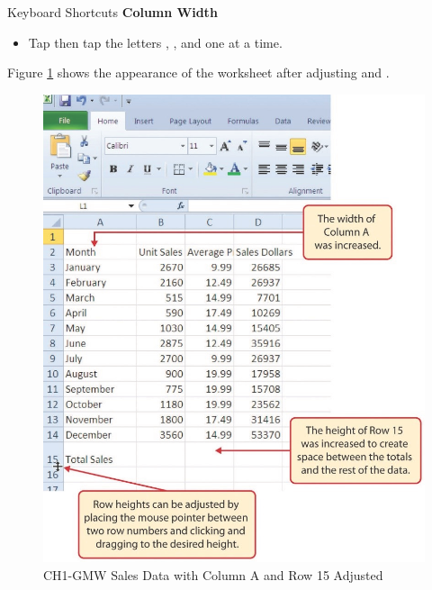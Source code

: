 \begin{center}
	\begin{shtcutbox}{Keyboard Shortcuts}
		\textbf{Column Width}
		\\
		\begin{itemize}
			\setlength{\itemsep}{0pt}
			\setlength{\parskip}{0pt}
			\setlength{\parsep}{0pt}
			
			\item Tap  then tap the letters , , and  one at a time.
			
		\end{itemize}
	\end{shtcutbox}
\end{center}

Figure \ref{01:fig25} shows the appearance of the worksheet after adjusting   and .

\begin{figure}[H]
	\centering
	\includegraphics[width=\maxwidth{.95\linewidth}]{gfx/ch01_fig25}
	\caption{CH1-GMW Sales Data with Column A and Row 15 Adjusted}
	\label{01:fig25}
\end{figure}

